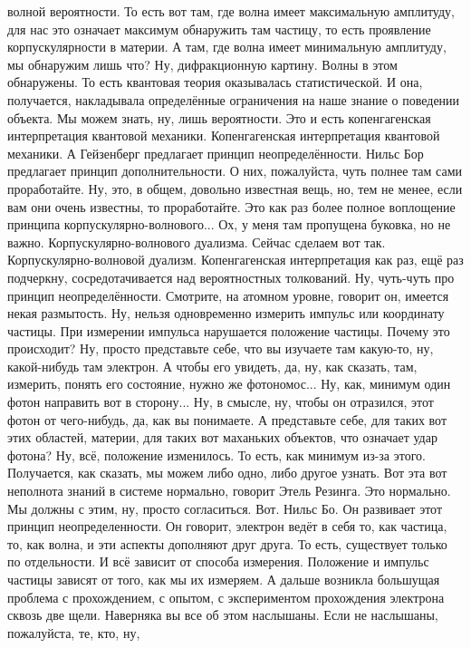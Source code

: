 волной вероятности. То есть вот там, где волна имеет максимальную амплитуду, для
нас это означает максимум обнаружить там частицу, то есть проявление
корпускулярности в материи. А там, где волна имеет минимальную амплитуду, мы
обнаружим лишь что? Ну, дифракционную картину. Волны в этом обнаружены. То есть
квантовая теория оказывалась статистической. И она, получается, накладывала
определённые ограничения на наше знание о поведении объекта. Мы можем знать, ну,
лишь вероятности. Это и есть копенгагенская интерпретация квантовой механики.
Копенгагенская интерпретация квантовой механики. А Гейзенберг предлагает принцип
неопределённости. Нильс Бор предлагает принцип дополнительности. О них,
пожалуйста, чуть полнее там сами проработайте. Ну, это, в общем, довольно
известная вещь, но, тем не менее, если вам они очень известны, то проработайте.
Это как раз более полное воплощение принципа корпускулярно-волнового... Ох, у
меня там пропущена буковка, но не важно. Корпускулярно-волнового дуализма.
Сейчас сделаем вот так. Корпускулярно-волновой дуализм. Копенгагенская
интерпретация как раз, ещё раз подчеркну, сосредотачивается над вероятностных
толкований. Ну, чуть-чуть про принцип неопределённости. Смотрите, на атомном
уровне, говорит он, имеется некая размытость. Ну, нельзя одновременно измерить
импульс или координату частицы. При измерении импульса нарушается положение
частицы. Почему это происходит? Ну, просто представьте себе, что вы изучаете там
какую-то, ну, какой-нибудь там электрон. А чтобы его увидеть, да, ну, как
сказать, там, измерить, понять его состояние, нужно же фотономос... Ну, как,
минимум один фотон направить вот в сторону... Ну, в смысле, ну, чтобы он
отразился, этот фотон от чего-нибудь, да, как вы понимаете. А представьте себе,
для таких вот этих областей, материи, для таких вот маханьких объектов, что
означает удар фотона? Ну, всё, положение изменилось. То есть, как минимум из-за
этого. Получается, как сказать, мы можем либо одно, либо другое узнать. Вот эта
вот неполнота знаний в системе нормально, говорит Этель Резинга. Это нормально.
Мы должны с этим, ну, просто согласиться. Вот. Нильс Бо. Он развивает этот
принцип неопределенности. Он говорит, электрон ведёт в себя то, как частица, то,
как волна, и эти аспекты дополняют друг друга. То есть, существует только по
отдельности. И всё зависит от способа измерения. Положение и импульс частицы
зависят от того, как мы их измеряем. А дальше возникла большущая проблема с
прохождением, с опытом, с экспериментом прохождения электрона сквозь две щели.
Наверняка вы все об этом наслышаны. Если не наслышаны, пожалуйста, те, кто, ну,
